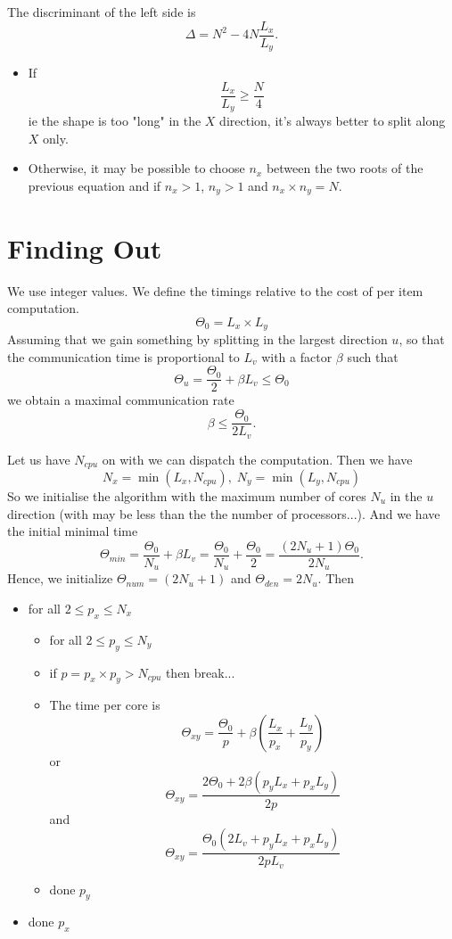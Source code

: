 \documentclass[aps]{revtex4}
\begin{document}
The discriminant of the left side is 
\begin{equation}
	\Delta = N^2 - 4 N \dfrac{L_x}{L_y}.
\end{equation}
\begin{itemize}
	\item If 
		\begin{equation}
		\dfrac{L_x}{L_y}\geq \dfrac{N}{4}
		\end{equation}
		ie the shape is too "long" in the $X$ direction, it's always better to split along $X$ only.
	\item Otherwise, it may be possible to choose $n_x$ between the two roots of the previous equation
	and if $n_x>1$, $n_y>1$ and $n_x \times n_y = N$.
\end{itemize}

\section{Finding Out}
We use integer values.
We define the timings relative to the cost of per item computation.
$$ 
	\Theta_0 = L_x \times L_y
$$
Assuming that we gain something by splitting in the largest direction $u$, so that the communication time is proportional
to $L_v$ with a factor $\beta$ such that
$$
	\Theta_u = \dfrac{\Theta_0}{2} + \beta  L_v \leq \Theta_0
$$
we obtain a maximal communication rate
$$
	\beta \leq \dfrac{\Theta_0}{2L_v}.
$$

Let us have $N_{cpu}$ on with we can dispatch the computation.
Then we have
$$
	N_{x} = \min\left(L_x,N_{cpu}\right), \; N_y = \min\left(L_y,N_{cpu}\right)
$$
So we initialise the algorithm with the maximum number of cores $N_u$ in the $u$ direction (with may be less than the the number of processors...).
And we have the initial minimal time
$$
	\Theta_{min} = \dfrac{\Theta_0}{N_u} + \beta L_v =  \dfrac{\Theta_0}{N_u} + \dfrac{\Theta_0}{2} = \dfrac{\left(2N_u+1\right)\Theta_0}{2N_u}.
$$
Hence, we initialize $\Theta_{num}=\left(2N_u+1\right)$ and $\Theta_{den}=2N_u$.
Then
\begin{itemize}
	\item for all $2\leq p_x \leq N_x$
	\begin{itemize}
	\item for all $2\leq p_y \leq N_y$
	\item if $p=p_x \times p_y>N_{cpu}$ then break...
	\item The time per core is
		$$
			\Theta_{xy} = \dfrac{\Theta_0}{p} + \beta\left(\dfrac{L_x}{p_x}+\dfrac{L_y}{p_y}\right)
		$$
		or
		$$
			\Theta_{xy} = \dfrac{2\Theta_0+2\beta\left(p_y L_x + p_x L_y\right)}{2p}
		$$
		and
		$$
			\Theta_{xy} = \dfrac{\Theta_0 \left(2L_v + p_y L_x + p_x L_y\right)}{2pL_v}
		$$
	\item done $p_y$
	\end{itemize}
	\item done $p_x$
\end{itemize}
\end{document}
